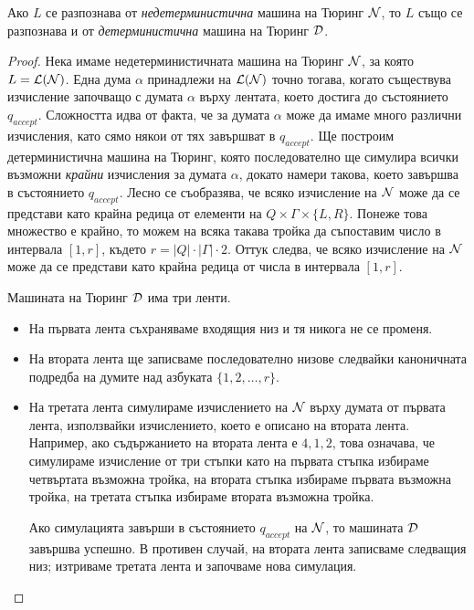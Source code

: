 \begin{framed}
  \begin{thm}
    Ако $L$ се разпознава от {\em недетерминистична} машина на Тюринг $\mathcal{N}$, то $L$
    също се разпознава и от {\em детерминистична} машина на Тюринг $\mathcal{D}$.
  \end{thm}
\end{framed}
\begin{proof}
  Нека имаме недетерминистичната машина на Тюринг $\mathcal{N}$, за която $L = \mathcal{L}(\mathcal{N})$.
  Една дума $\alpha$ принадлежи на $\mathcal{L}(\mathcal{N})$ точно тогава, когато съществува изчисление 
  започващо с думата $\alpha$ върху лентата, което достига до състоянието $q_{accept}$.
  Сложността идва от факта, че за думата $\alpha$ може да имаме много различни изчисления, 
  като сямо някои от тях завършват в $q_{accept}$. Ще построим детерминистична машина на Тюринг,
  която последователно ще симулира всички възможни {\em крайни} изчисления за думата $\alpha$, докато 
  намери такова, което завършва в състоянието $q_{accept}$.
  Лесно се съобразява, че всяко изчисление на $\mathcal{N}$ може да се представи като 
  крайна редица от елементи на $Q \times \Gamma \times \{L,R\}$.
  Понеже това множество е крайно, то можем на всяка такава тройка да
  съпоставим число в интервала $[1,r]$, където $r = |Q| \cdot |\Gamma|\cdot2$.
  Оттук следва, че всяко изчисление на $\mathcal{N}$ може да се представи като крайна 
  редица от числа в интервала $[1,r]$.

  Машината на Тюринг $\mathcal{D}$ има три ленти.
  
  \begin{itemize}
  \item 
    На първата лента съхраняваме входящия низ и тя никога не се променя.
  \item
    На втората лента ще записваме последователно низове следвайки каноничната подредба на 
    думите над азбуката $\{1,2,\dots,r\}$.
  \item
    На третата лента симулираме изчислението на $\mathcal{N}$ върху думата от първата лента, използвайки изчислението, 
    което е описано на втората лента. Например, ако съдържанието на втората лента е $4,1,2$,
    това означава, че симулираме изчисление от три стъпки като на първата стъпка избираме четвъртата
    възможна тройка, на втората стъпка избираме първата възможна тройка, на третата стъпка избираме втората възможна тройка.
    
    Ако симулацията завърши в състоянието $q_{accept}$ на $\mathcal{N}$, то машината $\mathcal{D}$ завършва успешно.
    В противен случай, на втората лента записваме следващия низ; изтриваме третата лента и започваме нова симулация.
  \end{itemize}
\end{proof}

